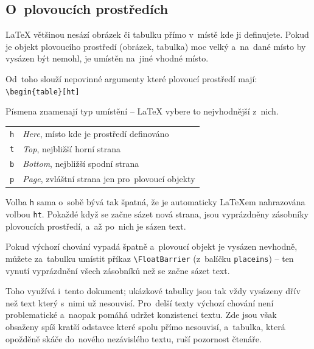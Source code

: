 \subsection{O~plovoucích prostředích}

\LaTeX{} většinou nesází obrázek či tabulku přímo v~místě kde ji definujete.
Pokud je objekt plovoucího prostředí (obrázek, tabulka) moc velký a~na~dané místo by vysázen být nemohl, je umístěn na~jiné vhodné místo.

Od~toho slouží nepovinné argumenty které plovoucí prostředí mají:
\\
\verb|\begin{table}[ht]|

Písmena znamenají typ umístění -- \LaTeX{} vybere to nejvhodnější z~nich.

\begin{table}[ht]
    \centering
    \begin{tabular}{|l|l|}
    \texttt{h} & \emph{Here}, místo kde je prostředí definováno \\
    \texttt{t} & \emph{Top}, nejbližší horní strana \\
    \texttt{b} & \emph{Bottom}, nejbližší spodní strana \\
    \texttt{p} & \emph{Page}, zvláštní strana jen pro~plovoucí objekty \\
    \end{tabular}
\end{table}
\FloatBarrier

Volba \texttt{h} sama o~sobě bývá tak špatná, že je automaticky \LaTeX{}em nahrazována volbou \texttt{ht}.
Pokaždé když se začne sázet nová strana, jsou vyprázdněny zásobníky plovoucích prostředí, a~až po~nich je sázen text.

Pokud výchozí chování vypadá špatně a~plovoucí objekt je vysázen nevhodně, můžete za~tabulku umístit příkaz \verb|\FloatBarrier| (z~balíčku \texttt{placeins}) -- ten vynutí vyprázdnění všech zásobníků než se začne sázet text.

Toho využívá i~tento dokument; ukázkové tabulky jsou tak vždy vysázeny dřív než text který s~nimi už nesouvisí.
Pro~delší texty výchozí chování není problematické a~naopak pomáhá udržet konzistenci textu.
Zde jsou však obsaženy spíš kratší odstavce které spolu přímo nesouvisí, a~tabulka, která opožděně skáče do~nového nezávislého textu, ruší pozornost čtenáře.

